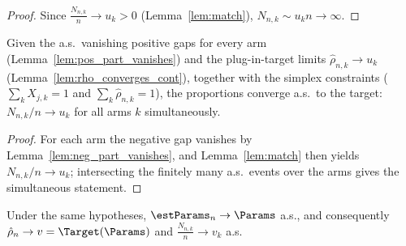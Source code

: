 \begin{proof}\leanok
{}
Since $\frac{N_{n,k}}{n}\to u_k > 0$ (Lemma~\ref{lem:match}), $N_{n,k}\sim u_k n
\to\infty$.
\end{proof}

\begin{lemma}\label{lem:consistency_matching}
\leanok
{}
Given the a.s.\ vanishing positive gaps for every arm (Lemma~\ref{lem:pos_part_vanishes}) and the
plug-in-target limits $\hat\rho_{n,k}\to u_k$ (Lemma~\ref{lem:rho_converges_cont}), together with
the simplex constraints ($\sum_k X_{j,k}=1$ and $\sum_k\hat\rho_{n,k}=1$), the proportions converge
a.s.\ to the target: $N_{n,k}/n \to u_k$ for all arms $k$ simultaneously.
\end{lemma}

\begin{proof}\leanok
{}
For each arm the negative gap vanishes by Lemma~\ref{lem:neg_part_vanishes}, and
Lemma~\ref{lem:match} then yields $N_{n,k}/n\to u_k$; intersecting the finitely many a.s.\ events
over the arms gives the simultaneous statement.
\end{proof}

\begin{lemma}\label{lem:theta_consistent}
\leanok
{}
Under the same hypotheses, $\estParams_n \to \Params$ a.s., and consequently
$\hat{\rho}_n \to v = \Target(\Params)$ and $\frac{N_{n,k}}{n}\to v_k$ a.s.
\end{lemma}

